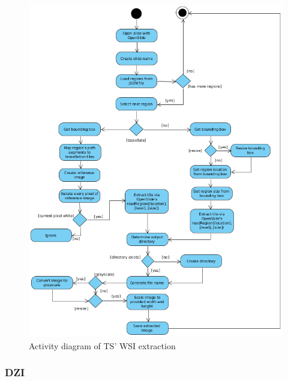 \begin{figure}[H]
	\begin{center}
		\includegraphics[scale=0.5]{img/ts_wsi_uml.png}
		\caption{Activity diagram of TS' WSI extraction}
		\label{fig5_tsWsiUml}
	\end{center}
\end{figure}


\subsubsection{DZI}

